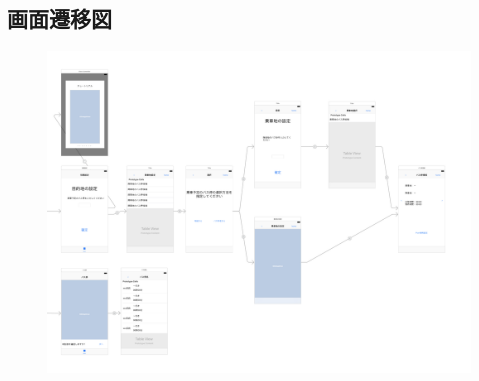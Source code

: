 \documentclass[openany,11pt,papersize]{jsbook}
\begin{document}
  \begin{appendix}
  
\chapter{画面遷移図}
\begin{figure}[htbp]
  \begin{center}
    \includegraphics[clip,width=19cm,angle=90]{img/picture.png}
    \label{fig:senni}
  \end{center}
\end{figure}


\end{appendix}
\end{document}
